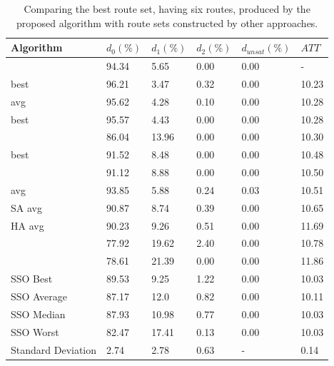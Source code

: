 \begin{table}[H]
    \centering
    \hspace*{-1.0cm}
    \begin{tabular}{|l||l|l|l|l|l|}
    \hline
    Algorithm & $d_0(\%)$ & $d_1(\%)$ & $d_2(\%)$ & $d_{unsat}(\%)$ & $ATT$ \\
    \hline
    \citet{nikolic14} & 94.34 & 5.65 & 0.00 & 0.00 & - \\
    \citet{kechagiopoulos14} best & 96.21 & 3.47 & 0.32 & 0.00 & 10.23 \\
    \citet{kechagiopoulos14} avg & 95.62 & 4.28 & 0.10 & 0.00 & 10.28 \\
    \citet{chew12} best & 95.57 & 4.43 & 0.00 & 0.00 & 10.28 \\
    \citet{chakroborty02} & 86.04 & 13.96 & 0.00 & 0.00 & 10.30 \\
    \citet{fan10} best & 91.52 & 8.48 & 0.00 & 0.00 & 10.48  \\
    \citet{zhang10} & 91.12 & 8.88 & 0.00 & 0.00 & 10.50 \\
    \citet{chew12} avg & 93.85 & 5.88 & 0.24 & 0.03 & 10.51 \\
    \citet{fan10} SA avg & 90.87 & 8.74 & 0.39 & 0.00 & 10.65 \\
    \citet{fan10} HA avg & 90.23 & 9.26 & 0.51 & 0.00 & 11.69 \\
    \citet{kidwai98} & 77.92 & 19.62 & 2.40 & 0.00 & 10.78 \\
    \citet{baaj91} & 78.61 & 21.39 & 0.00 & 0.00 & 11.86 \\
    \hline
    SSO Best & 89.53 & 9.25 & 1.22 & 0.00 & 10.03\\
    SSO Average & 87.17 & 12.0 & 0.82 & 0.00 & 10.11\\
    SSO Median & 87.93 & 10.98 & 0.77 & 0.00 & 10.03\\
    SSO Worst & 82.47 & 17.41 & 0.13 & 0.00 & 10.03\\
    Standard Deviation & 2.74 & 2.78 & 0.63 & - & 0.14\\
    \hline
    \end{tabular}
    \caption {Comparing the best route set, having six routes, produced by the proposed algorithm with route sets constructed by other approaches.}
    \label{table:performanceComparison_6}
\end{table}

